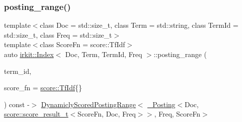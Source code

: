 \subsubsection{\texorpdfstring{posting\+\_\+range()}{posting\_range()}\hspace{0.1cm}{\footnotesize\ttfamily [2/2]}}
{\footnotesize\ttfamily template$<$class Doc  = std\+::size\+\_\+t, class Term  = std\+::string, class Term\+Id  = std\+::size\+\_\+t, class Freq  = std\+::size\+\_\+t$>$ \\
template$<$class Score\+Fn  = score\+::\+Tf\+Idf$>$ \\
auto \hyperlink{classirkit_1_1Index}{irkit\+::\+Index}$<$ Doc, Term, Term\+Id, Freq $>$\+::posting\+\_\+range (\begin{DoxyParamCaption}\item[{Term\+Id}]{term\+\_\+id,  }\item[{Score\+Fn}]{score\+\_\+fn = {\ttfamily \hyperlink{structirkit_1_1score_1_1TfIdf}{score\+::\+Tf\+Idf}\{\}} }\end{DoxyParamCaption}) const -\/$>$ \hyperlink{classirkit_1_1DynamiclyScoredPostingRange}{Dynamicly\+Scored\+Posting\+Range}$<$
            \hyperlink{structirkit_1_1__Posting}{\+\_\+\+Posting}$<$Doc, \hyperlink{namespaceirkit_1_1score_ab6226695d6d5c54c84fcf2cb8e90c8b3}{score\+::score\+\_\+result\+\_\+t}$<$Score\+Fn, Doc, Freq$>$$>$,
            Freq,
            Score\+Fn$>$
    \hspace{0.3cm}{\ttfamily [inline]}}

\mbox{\label{classirkit_1_1Index_ada30daf417b2dc957840170d90dba798}} 
